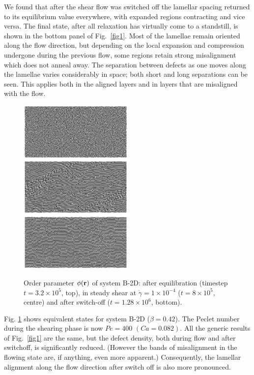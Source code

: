 \documentclass[8.5pt,twoside,twocolumn]{article}
\newcommand{\e}[1]{\times10^{#1}}
\begin{document}
We found that after the shear flow was switched off the lamellar spacing returned to its equilibrium value everywhere, with expanded regions contracting and vice versa. The final state, after all relaxation has virtually come to a standstill, is shown in the bottom panel of Fig.~\ref{fig1}. 
Most of the lamellae remain oriented along the flow direction, but depending on the local expansion and compression undergone during the previous flow, some regions retain strong misalignment which does not anneal away. The separation between defects as one moves along the lamellae varies considerably in space; both short and long separations can be seen. This applies both in the aligned layers and in layers that are misaligned with the flow. 

\begin{figure}[htp]
\centering
\includegraphics[angle=0,width=0.5\textwidth]{phi_run707_320.jpg}\\
\includegraphics[angle=0,width=0.5\textwidth]{phi_run710_800.jpg}\\
\includegraphics[angle=0,width=0.5\textwidth]{phi_run765_1280.jpg}
\caption{Order parameter $\phi({\bf r})$ of system B-2D: after equilibration (timestep $t=3.2\e{5}$, top), in steady shear at $\dot{\gamma}=1\times10^{-4}$ ($t=8\e{5}$, centre) and after switch-off ($t=1.28\e{6}$, bottom).}
\label{fig2}
\end{figure}

Fig. \ref{fig2} shows equivalent states for system B-2D ($\beta = 0.42$).
The Peclet number during the shearing phase is now $Pe = 400$ $(Ca = 0.082)$.
All the generic results of Fig.~\ref{fig1} are the same, but the defect density, both during flow and after switchoff, is significantly reduced. (However the bands of misalignment in the flowing state are, if anything, even more apparent.) Consequently, the lamellar alignment along the flow direction after switch off is also more pronounced.
\end{document}
